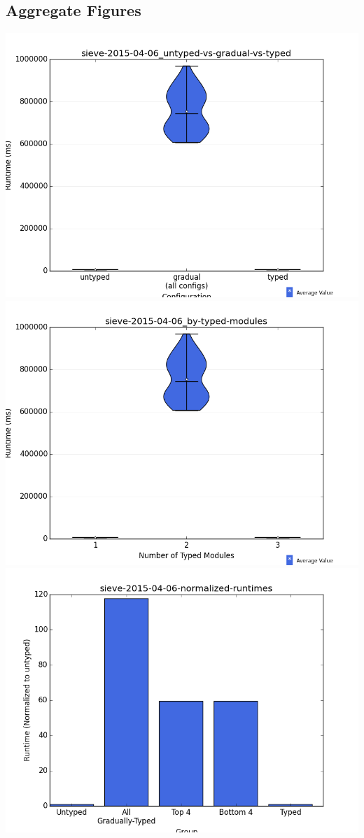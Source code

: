 \documentclass{article}
\begin{document}
\subsection{Aggregate Figures}
\includegraphics[width=\textwidth]{sieve-2015-04-06_untyped-vs-gradual-vs-typed-violin.png}
\includegraphics[width=\textwidth]{sieve-2015-04-06_by-typed-modules-violin.png}
\includegraphics[width=\textwidth]{sieve-2015-04-06-normalized-runtimes-bar.png}
\end{document}
